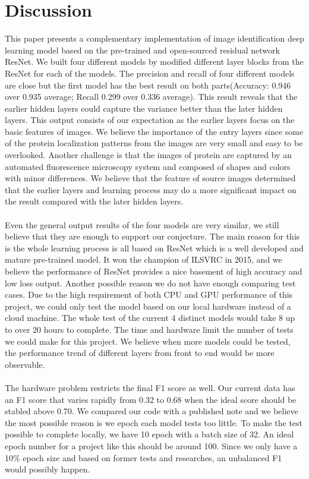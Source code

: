 \documentclass{article}
\begin{document}
\section{Discussion}
This paper presents a complementary implementation of image identification deep learning model based on the pre-trained and open-sourced residual network ResNet. We built four different models by modified different layer blocks from the ResNet for each of the models. The precision and recall of four different models are close but the first model has the best result on both parts(Accuracy: 0.946 over 0.935 average; Recall 0.299 over 0.336 average). This result reveals that the earlier hidden layers could capture the variance better than the later hidden layers. This output consists of our expectation as the earlier layers focus on the basic features of images. We believe the importance of the entry layers since some of the protein localization patterns from the images are very small and easy to be overlooked. Another challenge is that the images of protein are captured by an automated fluorescence microscopy system and composed of shapes and colors with minor differences. We believe that the feature of source images determined that the earlier layers and learning process may do a more significant impact on the result compared with the later hidden layers.
\\
\\
Even the general output results of the four models are very similar, we still believe that they are enough to support our conjecture. The main reason for this is the whole learning process is all based on ResNet which is a well developed and mature pre-trained model. It won the champion of ILSVRC in 2015, and we believe the performance of ResNet provides a nice basement of high accuracy and low loss output.\cite{winner} Another possible reason we do not have enough comparing test cases.
Due to the high requirement of both CPU and GPU performance of this project, we could only test the model based on our local hardware instead of a cloud machine. The whole test of the current 4 distinct models would take 8 up to over 20 hours to complete. The time and hardware limit the number of tests we could make for this project. We believe when more models could be tested, the performance trend of different layers from front to end would be more observable.
\\
\\
The hardware problem restricts the final F1 score as well. Our current data has an F1 score that varies rapidly from 0.32 to 0.68 when the ideal score should be stabled above 0.70. We compared our code with a published note\cite{note} and we believe the most possible reason is we epoch each model tests too little. To make the test possible to complete locally, we have 10 epoch with a batch size of 32. An ideal epoch number for a project like this should be around 100. Since we only have a 10\% epoch size and based on former tests and researches\cite{100epo}, an unbalanced F1 would possibly happen.
\end{document}

